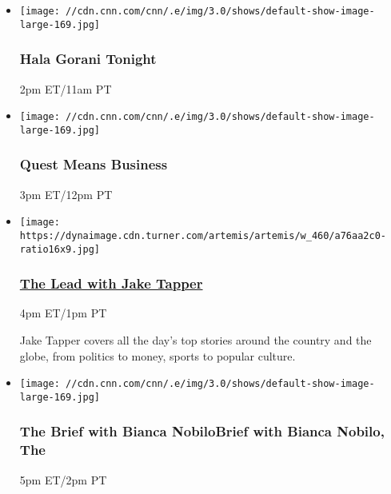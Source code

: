 \begin{itemize}
\item
  \texttt{[image: //cdn.cnn.com/cnn/.e/img/3.0/shows/default-show-image-large-169.jpg]}

  \hypertarget{hala-gorani-tonight-2}{%
  \subsubsection{Hala Gorani Tonight}\label{hala-gorani-tonight-2}}

  2pm ET/11am PT
\end{itemize}

\begin{itemize}
\item
  \texttt{[image: //cdn.cnn.com/cnn/.e/img/3.0/shows/default-show-image-large-169.jpg]}

  \hypertarget{quest-means-business-2}{%
  \subsubsection{Quest Means Business}\label{quest-means-business-2}}

  3pm ET/12pm PT
\end{itemize}

\begin{itemize}
\item
  \href{/specials/tv/all-shows}{}

  \texttt{[image: https://dynaimage.cdn.turner.com/artemis/artemis/w\_460/a76aa2c0-ratio16x9.jpg]}

  \hypertarget{the-lead-with-jake-tapper-2}{%
  \subsubsection{\texorpdfstring{\href{/specials/tv/all-shows}{The Lead
  with Jake
  Tapper}}{The Lead with Jake Tapper}}\label{the-lead-with-jake-tapper-2}}

  4pm ET/1pm PT

  Jake Tapper covers all the day's top stories around the country and
  the globe, from politics to money, sports to popular culture.
\end{itemize}

\begin{itemize}
\item
  \texttt{[image: //cdn.cnn.com/cnn/.e/img/3.0/shows/default-show-image-large-169.jpg]}

  \hypertarget{the-brief-with-bianca-nobilobrief-with-bianca-nobilo-the--2}{%
  \subsubsection{The Brief with Bianca NobiloBrief with Bianca Nobilo,
  The
  }\label{the-brief-with-bianca-nobilobrief-with-bianca-nobilo-the--2}}

  5pm ET/2pm PT
\end{itemize}

